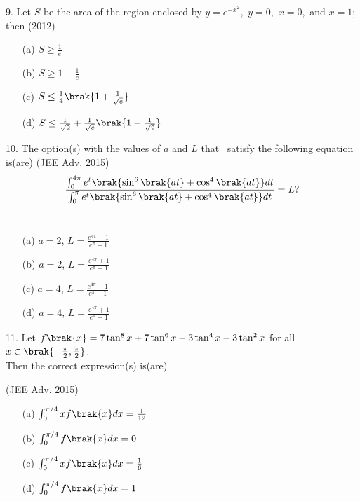 \iffalse
  \title{Assignment}
  \author{AI24BTECH11008-G.Sarvajith}
  \section{mcq-single}
\fi

\item 9. Let  $ S $ be the area of the region enclosed by $y = e^{-x^2} ,$  $y = 0 ,$ $x = 0 ,$ and $ x = 1 $; then \hfill (2012)

\begin{enumerate}
\item[(a)] $ S \geq \frac{1}{e} $
\item[(b)] $S \geq 1 - \frac{1}{e}$
\item[(c)] $ S \leq \frac{1}{4} \brak{1 + \frac{1}{\sqrt{e}}}$
\item[(d)] $S\leq\frac{1}{\sqrt{2}}+\frac{1}{\sqrt{e}}\brak{1 -\frac{1}{\sqrt{2}}} $
\end{enumerate}

\item 10. The option(s) with the values of $a$ and $L$ that \ satisfy the following equation is(are) \hfill (JEE Adv. 2015)
\begin{align*}
    \frac{\int_0^{4\pi} e^t  \brak{\sin^6\brak{at} + \cos^4\brak{at}}  dt}{\int_0^{\pi} e^t  \brak{\sin^6\brak{at} + \cos^4\brak{at}} dt} = L?
\end{align*} \\
\begin{enumerate}
\item  [(a)] $a = 2$, $L = \frac{e^{4\pi} - 1}{e^\pi - 1}$
\item [(b)] $a = 2$, $L = \frac{e^{4\pi} + 1}{e^\pi + 1}$
\item [(c)] $a = 4$, $L = \frac{e^{4\pi} - 1}{e^\pi - 1}$
\item[(d)] $a = 4$, $L = \frac{e^{4\pi} + 1}{e^\pi + 1}$
\end{enumerate}

\item 11. Let $f\brak{x}= 7\tan^8x + 7\tan^6x - 3\tan^4x - 3\tan^2x$ for all $x \in \brak{-\frac{\pi}{2}, \frac{\pi}{2}} $. \\
Then the correct expression(s) is(are)

\hfill  (JEE Adv. 2015)
\begin{enumerate}
\item[(a)] $\int_0^{\pi/4} x f\brak{x}dx = \frac{1}{12}$
\item[(b)]$\int_0^{\pi/4} f\brak{x}dx = 0$
\item[(c)] $\int_0^{\pi/4} x f\brak{x}dx = \frac{1}{6}$
\item [(d)] $\int_0^{\pi/4} f\brak{x}dx = 1$
\end{enumerate}

